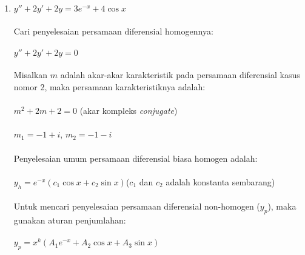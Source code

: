 \begin{enumerate}[1.]
	\item \begin{math} y'' + 2y' + 2y = 3e^{-x} + 4 \cos x \end{math} \\ \\
	Cari penyelesaian persamaan diferensial homogennya: \\ \\
	\begin{math}  y'' + 2y' + 2y = 0 \end{math} \\ \\
	Misalkan \begin{math} m \end{math} adalah akar-akar karakteristik pada persamaan diferensial kasus nomor 2, maka persamaan karakteristiknya adalah: \\ \\
	\begin{math} m^{2} +2m + 2 = 0 \end{math} (akar kompleks \textit{conjugate}) \\ \\
	\begin{math} m_1 = -1 + i \end{math}, \begin{math} m_2 = -1 - i \end{math} \\ \\
	Penyelesaian umum persamaan diferensial biasa homogen adalah: \\ \\
	\begin{math} y_h = e^{-x} (c_1 \cos x + c_2 \sin x) \end{math}(\begin{math} c_1 \end{math} dan \begin{math} c_2 \end{math} adalah konstanta sembarang) \\ \\
	Untuk mencari penyelesaian persamaan diferensial non-homogen (\begin{math} y_p \end{math}), maka gunakan aturan penjumlahan: \\ \\
	\begin{math} y_p = x^{k} (A_1 e^{-x} + A_2 \cos x + A_3 \sin x) \end{math} \\ \\

\end{enumerate}
